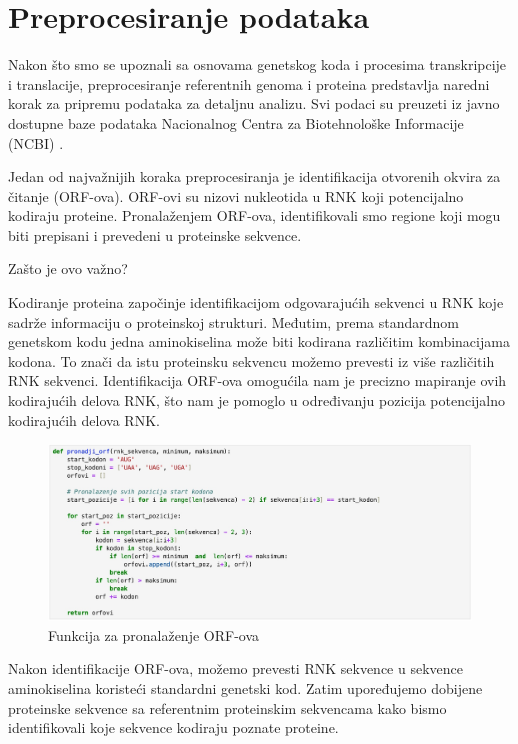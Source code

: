 \documentclass[a4paper,12pt]{article}
\begin{document}
\section{Preprocesiranje podataka}
Nakon što smo se upoznali sa osnovama genetskog koda i procesima transkripcije i translacije, preprocesiranje referentnih genoma i proteina predstavlja naredni korak za pripremu podataka za detaljnu analizu. Svi podaci su preuzeti iz javno dostupne baze podataka Nacionalnog Centra za Biotehnološke Informacije (NCBI) \cite{ncbi_database}.

\bigskip
Jedan od najvažnijih koraka preprocesiranja je identifikacija otvorenih okvira za čitanje (ORF-ova).
ORF-ovi su nizovi nukleotida u RNK koji potencijalno kodiraju proteine. Pronalaženjem ORF-ova,
identifikovali smo regione koji mogu biti prepisani i prevedeni u proteinske sekvence.

\medskip
Zašto je ovo važno? 

\smallskip
Kodiranje proteina započinje identifikacijom odgovarajućih sekvenci u RNK koje sadrže informaciju o proteinskoj strukturi. Međutim, prema standardnom genetskom kodu jedna aminokiselina može biti kodirana različitim kombinacijama kodona. To znači da istu proteinsku sekvencu možemo prevesti iz više različitih RNK sekvenci. Identifikacija ORF-ova omogućila nam je precizno mapiranje ovih kodirajućih delova RNK, što nam je pomoglo u određivanju pozicija potencijalno kodirajućih delova RNK.

\begin{figure}[h!]
  \centering
  \includegraphics[width=1\textwidth]{slika4.jpeg}
  \caption{Funkcija za pronalaženje ORF-ova}
  \label{fig:my_label}
\end{figure}

Nakon identifikacije ORF-ova, možemo prevesti RNK sekvence u sekvence aminokiselina  koristeći standardni genetski kod. Zatim upoređujemo dobijene proteinske sekvence sa referentnim proteinskim sekvencama kako bismo identifikovali koje sekvence kodiraju poznate proteine.
\end{document}
